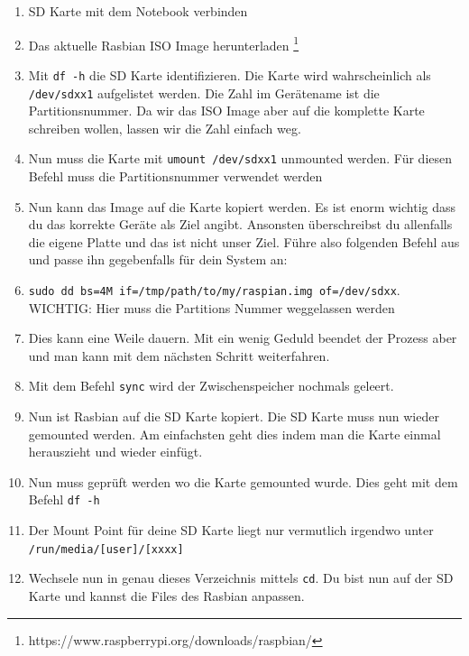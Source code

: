 \begin{enumerate}
	\item SD Karte mit dem Notebook verbinden
	\item Das aktuelle Rasbian ISO Image herunterladen \footnote{https://www.raspberrypi.org/downloads/raspbian/}
	\item Mit \lstinline|df -h| die SD Karte identifizieren. Die Karte wird wahrscheinlich als \lstinline|/dev/sdxx1| aufgelistet werden. Die Zahl im Gerätename ist die Partitionsnummer. Da wir das ISO Image aber auf die komplette Karte schreiben wollen, lassen wir die Zahl einfach weg. 
	\item Nun muss die Karte mit \lstinline|umount /dev/sdxx1| unmounted werden. Für diesen Befehl muss die Partitionsnummer verwendet werden
	\item Nun kann das Image auf die Karte kopiert werden. Es ist enorm wichtig dass du das korrekte Geräte als Ziel angibt. Ansonsten überschreibst du allenfalls die eigene Platte und das ist nicht unser Ziel. Führe also folgenden Befehl aus und passe ihn gegebenfalls für dein System an:
	\item \lstinline|sudo dd bs=4M if=/tmp/path/to/my/raspian.img of=/dev/sdxx|. WICHTIG: Hier muss die Partitions Nummer weggelassen werden
	\item Dies kann eine Weile dauern. Mit ein wenig Geduld beendet der Prozess aber und man kann mit dem nächsten Schritt weiterfahren.
	\item Mit dem Befehl \lstinline|sync| wird der Zwischenspeicher nochmals geleert.
	\item Nun ist Rasbian auf die SD Karte kopiert. Die SD Karte muss nun wieder gemounted werden. Am einfachsten geht dies indem man die Karte einmal herauszieht und wieder einfügt. 
	\item Nun muss geprüft werden wo die Karte gemounted wurde. Dies geht mit dem Befehl \lstinline|df -h|
	\item Der Mount Point für deine SD Karte liegt nur vermutlich irgendwo unter \lstinline|/run/media/[user]/[xxxx]|
	\item Wechsele nun in genau dieses Verzeichnis mittels \lstinline|cd|. Du bist nun auf der SD Karte und kannst die Files des Rasbian anpassen.
\end{enumerate}

